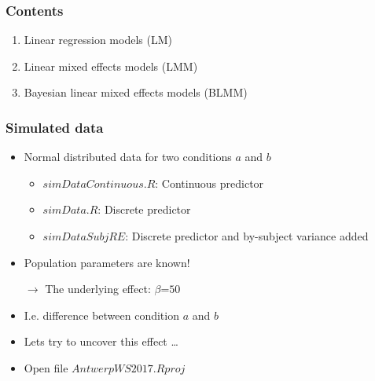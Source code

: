 \begin{frame}\frametitle{Contents}
	
	\begin{enumerate}
		\item Linear regression models (LM)
		\item Linear mixed effects models (LMM)
		\item Bayesian linear mixed effects models (BLMM)
	\end{enumerate}
	
	
\end{frame}



\begin{frame}[fragile]
	\frametitle{Simulated data}
	
	\begin{itemize}
		\item Normal distributed data for two conditions $a$ and $b$	
		\begin{itemize}
			\item $simDataContinuous.R$: Continuous predictor			
			\item $simData.R$: Discrete predictor
			\item $simDataSubjRE$: Discrete predictor and by-subject variance added
		\end{itemize}
		\item Population parameters are known!		
		\item[$\rightarrow$] The underlying effect: $\beta$=$50$
		\item I.e. difference between condition $a$ and $b$
		\item Lets try to uncover this effect \dots
		\item Open file $AntwerpWS2017.Rproj$
	\end{itemize}
	
\end{frame}